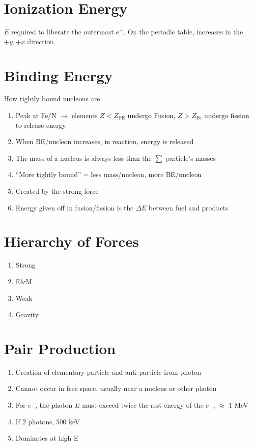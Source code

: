 \documentclass[10pt,a4paper]{article}
\begin{document}
\section{Ionization Energy} %
\label{sec:ionization_energy}
$E$ required to liberate the outermost $e^-$. On the periodic table, increases in the $+y,+x$ direction.

\section{Binding Energy} %
\label{sec:binding_energy}
How tightly bound nucleons are
\begin{enumerate}
    \item  Peak at Fe/N $\rightarrow$ elements $Z<Z_{\textrm{FE}}$ undergo Fusion, $Z>Z_{\textrm{Fe}} $ undergo fission to release energy
    \item When BE/nucleon increases, in reaction, energy is released
    \item The mass of a nucleus is always less than the $\sum $ particle's masses
    \item ``More tightly bound'' = less mass/nucleon, more BE/nucleon
    \item Created by the strong force
    \item Energy given off in fusion/fission is the $\Delta E$ between fuel and products
\end{enumerate}

\section{Hierarchy of Forces} %
\label{sec:heirarchy_of_forces}
\begin{enumerate}
    \item Strong
    \item E\&M
    \item Weak
    \item Gravity
\end{enumerate}

\section{Pair Production} %
\label{sec:pair_production}
\begin{enumerate}
    \item Creation of elementary particle and anti-particle from photon
    \item Cannot occur in free space, usually near a nucleus or other photon
    \item For $e^-$, the photon $E$ must exceed twice the rest energy of the $e^-$, $\approx $ 1 MeV
    \item If 2 photons, 500 keV
    \item Dominates at high E
\end{enumerate}
\end{document}
